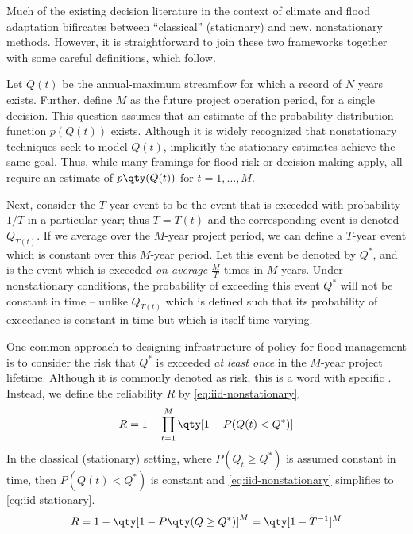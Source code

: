\documentclass[11pt]{article}
\begin{document}
Much of the existing decision literature in the context of climate and flood adaptation bifircates between ``classical'' (stationary) and new, nonstationary methods.
However, it is straightforward to join these two frameworks together with some careful definitions, which follow.

Let $Q(t)$ be the annual-maximum streamflow for which a record of $N$ years exists.
Further, define $M$ as the future project operation period, for a single decision.
This question assumes that an estimate of the probability distribution function $p(Q(t))$ exists.
Although it is widely recognized that nonstationary techniques seek to model $Q(t)$, implicitly the stationary estimates achieve the same goal.
Thus, while many framings for flood risk or decision-making apply, all require an estimate of $p \qty(Q(t))$ for $t = 1, \ldots, M$.

Next, consider the $T$-year event to be the event that is exceeded with probability $1/T$ in a particular year; thus $T=T(t)$ and the corresponding event is denoted $Q_{T(t)}$.
If we average over the $M$-year project period, we can define a $T$-year event which is constant over this $M$-year period.
Let this event be denoted by $Q^*$, and is the event which is exceeded \emph{on average} $\frac{M}{T}$ times in $M$ years.
Under nonstationary conditions, the probability of exceeding this event $Q^*$ will not be constant in time -- unlike $Q_{T(t)}$ which is defined such that its probability of exceedance is constant in time but which is itself time-varying.

One common approach to designing infrastructure of policy for flood management is to consider the risk that $Q^*$ is exceeded \emph{at least once} in the $M$-year project lifetime.
Although it is commonly denoted as risk, this is a word with specific \citep[see][for further discussion]{Merz2014}.
Instead, we define the reliability $R$ by \cref{eq:iid-nonstationary}.
\begin{equation}
	R = 1 - \prod_{t=1}^M \qty[1 - P(Q(t) < Q^*)] \label{eq:iid-nonstationary}
\end{equation}
In the classical (stationary) setting, where $P(Q_t \geq Q^*)$ is assumed constant in time, then $P(Q(t) < Q^*)$ is constant and  \cref{eq:iid-nonstationary} simplifies to \cref{eq:iid-stationary}.
\begin{equation}
	R = 1 - \qty[1 - P \qty(Q \geq Q^*)]^M = \qty[1 - T^{-1}]^M \label{eq:iid-stationary}
\end{equation}
\end{document}
